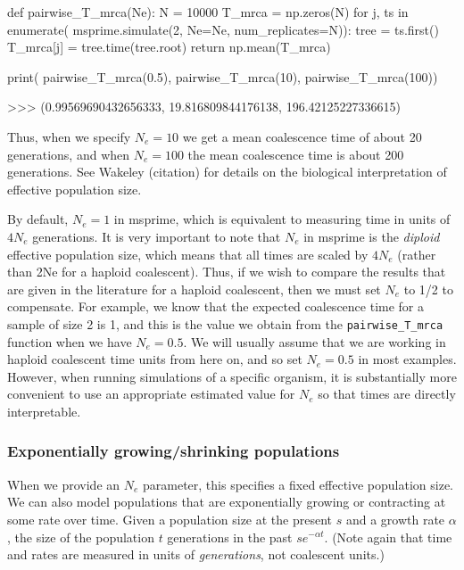 \documentclass[graybox]{svmult}
\begin{document}
\begin{pythoncode}
def pairwise_T_mrca(Ne):
    N = 10000
    T_mrca = np.zeros(N)
    for j, ts in enumerate(
            msprime.simulate(2, Ne=Ne, num_replicates=N)):
        tree = ts.first()
        T_mrca[j] = tree.time(tree.root)
    return np.mean(T_mrca)

print(
    pairwise_T_mrca(0.5), pairwise_T_mrca(10),
    pairwise_T_mrca(100))

>>> (0.99569690432656333, 19.816809844176138, 196.42125227336615)
\end{pythoncode}

    Thus, when we specify \(N_e=10\) we get a mean coalescence time of about
20 generations, and when \(N_e=100\) the mean coalescence time is about
200 generations. See Wakeley (citation) for details on the biological
interpretation of effective population size.

By default, \(N_e = 1\) in msprime, which is equivalent to measuring
time in units of \(4N_e\) generations. It is very important to note that
\(N_e\) in msprime is the \emph{diploid} effective population size,
which means that all times are scaled by \(4N_e\) (rather than 2Ne for a
haploid coalescent). Thus, if we wish to compare the results that are
given in the literature for a haploid coalescent, then we must set
\(N_e\) to 1/2 to compensate. For example, we know that the expected
coalescence time for a sample of size 2 is 1, and this is the value we
obtain from the \texttt{pairwise\_T\_mrca} function when we have
\(N_e=0.5\). We will usually assume that we are working in haploid
coalescent time units from here on, and so set \(N_e=0.5\) in most
examples. However, when running simulations of a specific organism, it
is substantially more convenient to use an appropriate estimated value
for \(N_e\) so that times are directly interpretable.

\subsubsection{Exponentially growing/shrinking
populations}\label{exponentially-growingshrinking-populations}

When we provide an \(N_e\) parameter, this specifies a fixed effective
population size. We can also model populations that are exponentially
growing or contracting at some rate over time. Given a population size
at the present \(s\) and a growth rate \(\alpha\), the size of the
population \(t\) generations in the past \(s e^{-\alpha t}\). (Note
again that time and rates are measured in units of \emph{generations},
not coalescent units.)
\end{document}
